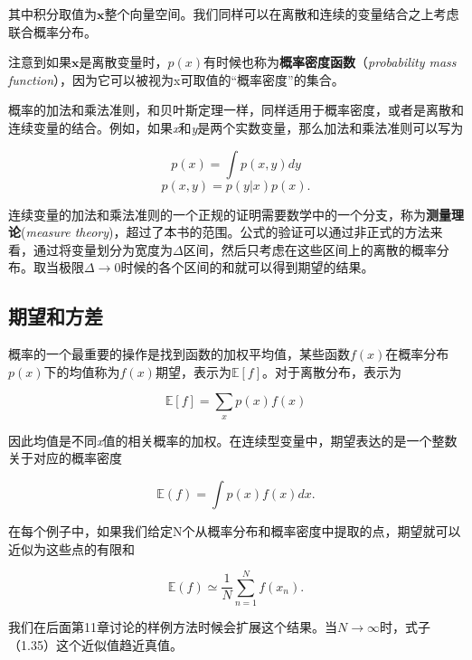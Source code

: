 	其中积分取值为$\mathbf{x}$整个向量空间。我们同样可以在离散和连续的变量结合之上考虑联合概率分布。
	
	注意到如果$\mathbf{x}$是离散变量时，$p(x)$有时候也称为\textbf{概率密度函数}（\textit{probability mass function}），因为它可以被视为x可取值的“概率密度”的集合。
	
	概率的加法和乘法准则，和贝叶斯定理一样，同样适用于概率密度，或者是离散和连续变量的结合。例如，如果\textit{x}和\textit{y}是两个实数变量，那么加法和乘法准则可以写为
	
	\begin{equation}
	p(x) = \int p(x, y) dy
	\end{equation}
	\begin{equation}
	p(x, y) = p(y|x)p(x).
	\end{equation}
	
	连续变量的加法和乘法准则的一个正规的证明需要数学中的一个分支，称为\textbf{测量理论}(\textit{measure theory})，超过了本书的范围。公式的验证可以通过非正式的方法来看，通过将变量划分为宽度为$\Delta$区间，然后只考虑在这些区间上的离散的概率分布。取当极限$\Delta \to 0$时候的各个区间的和就可以得到期望的结果。
	
{\color{blue} \subsection{期望和方差}}
	概率的一个最重要的操作是找到函数的加权平均值，某些函数$f(x)$在概率分布$p(x)$下的均值称为$f(x)$期望，表示为$\mathbb{E}[f]$。对于离散分布，表示为
	
	\begin{equation}
	\mathbb{E}[f] = \sum_x p(x)f(x)
	\end{equation}
	
	因此均值是不同\textit{x}值的相关概率的加权。在连续型变量中，期望表达的是一个整数关于对应的概率密度
	
	\begin{equation}
	\mathbb{E}(f) = \int p(x) f(x) dx.
	\end{equation}
	
	在每个例子中，如果我们给定N个从概率分布和概率密度中提取的点，期望就可以近似为这些点的有限和
	
	\begin{equation}
	\mathbb{E}(f) \simeq \frac{1}{N} \sum_{n = 1}^{N} f(x_n).
	\end{equation}
	
	我们在后面第11章讨论的样例方法时候会扩展这个结果。当$N \to \infty$时，式子（1.35）这个近似值趋近真值。
	
